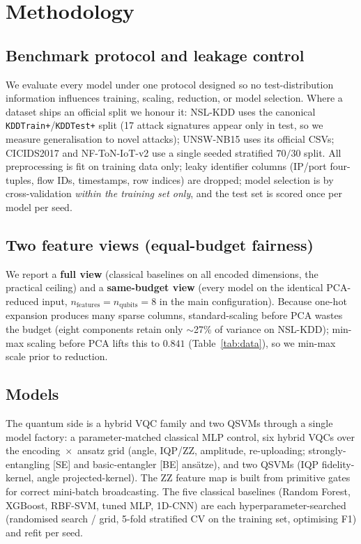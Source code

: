 \documentclass[preprint,11pt]{elsarticle}
\begin{document}
\section{Methodology}
\subsection{Benchmark protocol and leakage control}
We evaluate every model under one protocol designed so no test-distribution information influences
training, scaling, reduction, or model selection. Where a dataset ships an official split we honour
it: NSL-KDD uses the canonical \texttt{KDDTrain+}/\texttt{KDDTest+} split (17 attack signatures appear
only in test, so we measure generalisation to novel attacks); UNSW-NB15 uses its official CSVs;
CICIDS2017 and NF-ToN-IoT-v2 use a single seeded stratified $70/30$ split. All preprocessing is fit on
training data only; leaky identifier columns (IP/port four-tuples, flow IDs, timestamps, row indices)
are dropped; model selection is by cross-validation \emph{within the training set only}, and the test
set is scored once per model per seed.

\subsection{Two feature views (equal-budget fairness)}
We report a \textbf{full view} (classical baselines on all encoded dimensions, the practical ceiling)
and a \textbf{same-budget view} (every model on the identical PCA-reduced input, $n_{\text{features}}=
n_{\text{qubits}}=8$ in the main configuration). Because one-hot expansion produces many sparse columns,
standard-scaling before PCA wastes the budget (eight components retain only $\sim$27\% of variance on
NSL-KDD); min-max scaling before PCA lifts this to $0.841$ (Table~\ref{tab:data}), so we min-max scale
prior to reduction.

\subsection{Models}
The quantum side is a hybrid VQC family and two QSVMs through a single model factory: a
parameter-matched classical MLP control, six hybrid VQCs over the encoding~$\times$~ansatz grid
(angle, IQP/ZZ, amplitude, re-uploading; strongly-entangling [SE] and basic-entangler [BE] ans\"atze),
and two QSVMs (IQP fidelity-kernel, angle projected-kernel). The ZZ feature map is built from primitive
gates for correct mini-batch broadcasting. The five classical baselines (Random Forest, XGBoost,
RBF-SVM, tuned MLP, 1D-CNN) are each hyperparameter-searched (randomised search / grid, 5-fold
stratified CV on the training set, optimising F1) and refit per seed.
\end{document}
